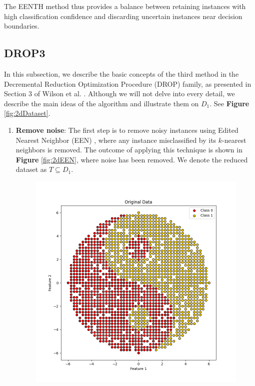 The EENTH method thus provides a balance between retaining instances with high classification confidence and discarding uncertain instances near decision boundaries.

\subsection{DROP3}
In this subsection, we describe the basic concepts of the third method in the Decremental Reduction Optimization Procedure (DROP) family, as presented in Section 3 of Wilson et al. \cite{wilson2000reduction}. Although we will not delve into every detail, we describe the main ideas of the algorithm and illustrate them on $D_1$. See \textbf{Figure} \ref{fig:2dDataset}.

\begin{enumerate}
	\item \textbf{Remove noise}: The first step is to remove noisy instances using Edited Nearest Neighbor (EEN) \cite{wilson1972asymptotic}, where any instance misclassified by its $ k $-nearest neighbors is removed. The outcome of applying this technique is shown in \textbf{Figure} \ref{fig:2dEEN}, where noise has been removed. We denote the reduced dataset as $ T \subseteq D_1 $.
	\begin{figure}[ht]
		\centering
		\begin{minipage}{0.45\textwidth}
			\centering
			\includegraphics[width=\textwidth]{figures/2dDataset} %

\end{minipage}
\end{figure}
\end{enumerate}
